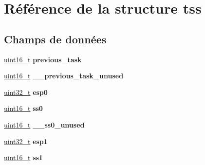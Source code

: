 \hypertarget{structtss}{\section{Référence de la structure tss}
\label{structtss}
}
\subsection*{Champs de données}
\begin{DoxyCompactItemize}
\item 
\hypertarget{structtss_ad53ac7d2e96d874b937cd8ba2ec99b68}{\hyperlink{kernel_2include_2types_8h_adf4d876453337156dde61095e1f20223}{uint16\+\_\+t} {\bfseries previous\+\_\+task}}\label{structtss_ad53ac7d2e96d874b937cd8ba2ec99b68}

\item 
\hypertarget{structtss_aa9c707a0e579d5c4aa5cdc6a74dc52f0}{\hyperlink{kernel_2include_2types_8h_adf4d876453337156dde61095e1f20223}{uint16\+\_\+t} {\bfseries \+\_\+\+\_\+previous\+\_\+task\+\_\+unused}}\label{structtss_aa9c707a0e579d5c4aa5cdc6a74dc52f0}

\item 
\hypertarget{structtss_a7e43a5ebd87f7dc5b342942daf46b6f1}{\hyperlink{kernel_2include_2types_8h_a33594304e786b158f3fb30289278f5af}{uint32\+\_\+t} {\bfseries esp0}}\label{structtss_a7e43a5ebd87f7dc5b342942daf46b6f1}

\item 
\hypertarget{structtss_a21766cd40c3c8f0036091d76956edc6c}{\hyperlink{kernel_2include_2types_8h_adf4d876453337156dde61095e1f20223}{uint16\+\_\+t} {\bfseries ss0}}\label{structtss_a21766cd40c3c8f0036091d76956edc6c}

\item 
\hypertarget{structtss_ae0b947bcd701d61513f54ae0fe5d8e67}{\hyperlink{kernel_2include_2types_8h_adf4d876453337156dde61095e1f20223}{uint16\+\_\+t} {\bfseries \+\_\+\+\_\+ss0\+\_\+unused}}\label{structtss_ae0b947bcd701d61513f54ae0fe5d8e67}

\item 
\hypertarget{structtss_ab2b4ce638811e1a254005e069886f8b3}{\hyperlink{kernel_2include_2types_8h_a33594304e786b158f3fb30289278f5af}{uint32\+\_\+t} {\bfseries esp1}}\label{structtss_ab2b4ce638811e1a254005e069886f8b3}

\item 
\hypertarget{structtss_aa527f4b4f275061d8750f527c7ab6fcf}{\hyperlink{kernel_2include_2types_8h_adf4d876453337156dde61095e1f20223}{uint16\+\_\+t} {\bfseries ss1}}\label{structtss_aa527f4b4f275061d8750f527c7ab6fcf}


\end{DoxyCompactItemize}
